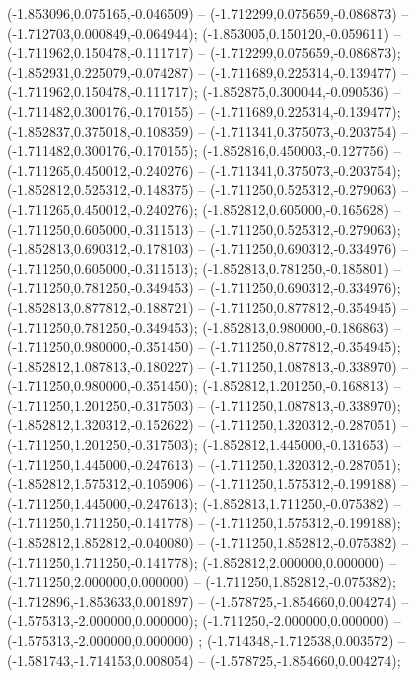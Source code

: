  (-1.853096,0.075165,-0.046509) -- (-1.712299,0.075659,-0.086873) -- (-1.712703,0.000849,-0.064944);
 (-1.853005,0.150120,-0.059611) -- (-1.711962,0.150478,-0.111717) -- (-1.712299,0.075659,-0.086873);
 (-1.852931,0.225079,-0.074287) -- (-1.711689,0.225314,-0.139477) -- (-1.711962,0.150478,-0.111717);
 (-1.852875,0.300044,-0.090536) -- (-1.711482,0.300176,-0.170155) -- (-1.711689,0.225314,-0.139477);
 (-1.852837,0.375018,-0.108359) -- (-1.711341,0.375073,-0.203754) -- (-1.711482,0.300176,-0.170155);
 (-1.852816,0.450003,-0.127756) -- (-1.711265,0.450012,-0.240276) -- (-1.711341,0.375073,-0.203754);
 (-1.852812,0.525312,-0.148375) -- (-1.711250,0.525312,-0.279063) -- (-1.711265,0.450012,-0.240276);
 (-1.852812,0.605000,-0.165628) -- (-1.711250,0.605000,-0.311513) -- (-1.711250,0.525312,-0.279063);
 (-1.852813,0.690312,-0.178103) -- (-1.711250,0.690312,-0.334976) -- (-1.711250,0.605000,-0.311513);
 (-1.852813,0.781250,-0.185801) -- (-1.711250,0.781250,-0.349453) -- (-1.711250,0.690312,-0.334976);
 (-1.852813,0.877812,-0.188721) -- (-1.711250,0.877812,-0.354945) -- (-1.711250,0.781250,-0.349453);
 (-1.852813,0.980000,-0.186863) -- (-1.711250,0.980000,-0.351450) -- (-1.711250,0.877812,-0.354945);
 (-1.852812,1.087813,-0.180227) -- (-1.711250,1.087813,-0.338970) -- (-1.711250,0.980000,-0.351450);
 (-1.852812,1.201250,-0.168813) -- (-1.711250,1.201250,-0.317503) -- (-1.711250,1.087813,-0.338970);
 (-1.852812,1.320312,-0.152622) -- (-1.711250,1.320312,-0.287051) -- (-1.711250,1.201250,-0.317503);
 (-1.852812,1.445000,-0.131653) -- (-1.711250,1.445000,-0.247613) -- (-1.711250,1.320312,-0.287051);
 (-1.852812,1.575312,-0.105906) -- (-1.711250,1.575312,-0.199188) -- (-1.711250,1.445000,-0.247613);
 (-1.852813,1.711250,-0.075382) -- (-1.711250,1.711250,-0.141778) -- (-1.711250,1.575312,-0.199188);
 (-1.852812,1.852812,-0.040080) -- (-1.711250,1.852812,-0.075382) -- (-1.711250,1.711250,-0.141778);
 (-1.852812,2.000000,0.000000) -- (-1.711250,2.000000,0.000000) -- (-1.711250,1.852812,-0.075382);
 (-1.712896,-1.853633,0.001897) -- (-1.578725,-1.854660,0.004274) -- (-1.575313,-2.000000,0.000000);
 (-1.711250,-2.000000,0.000000) -- (-1.575313,-2.000000,0.000000) ;
 (-1.714348,-1.712538,0.003572) -- (-1.581743,-1.714153,0.008054) -- (-1.578725,-1.854660,0.004274);
